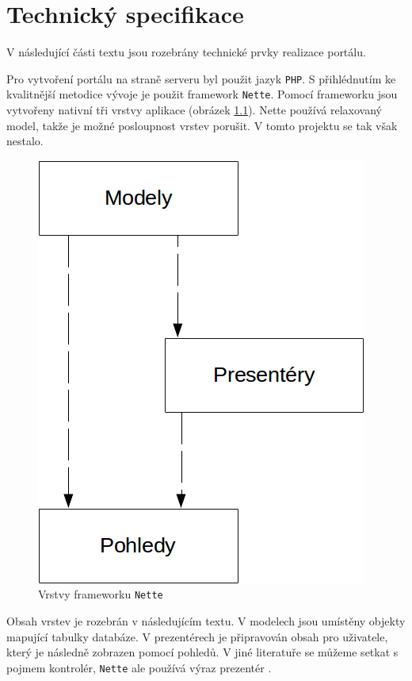 \documentclass[a4paper,10pt]{report}
\begin{document}
\chapter{Technický specifikace}

V následující části textu jsou rozebrány technické prvky realizace portálu.

Pro vytvoření portálu na straně serveru byl použit jazyk \texttt{PHP}. S přihlédnutím ke kvalitnější metodice vývoje je použit framework \texttt{Nette}. Pomocí frameworku jsou vytvořeny nativní tři vrstvy aplikace (obrázek \ref{nette}). Nette používá relaxovaný model, takže je možné posloupnost vrstev porušit. V tomto projektu se tak však nestalo.

\begin{figure}[H]
  \centering
	\includegraphics[scale=0.5]{nette.png} 
  \caption{Vrstvy frameworku \texttt{Nette}}
  \label{nette}
\end{figure}

Obsah vrstev je rozebrán v následujícím textu. V modelech jsou umístěny objekty mapující tabulky databáze. V prezentérech je připravován obsah pro uživatele, který je následně zobrazen pomocí pohledů. V jiné literatuře se můžeme setkat s pojmem kontrolér, \texttt{Nette} ale používá výraz prezentér \cite{nettfr}.
\end{document}
